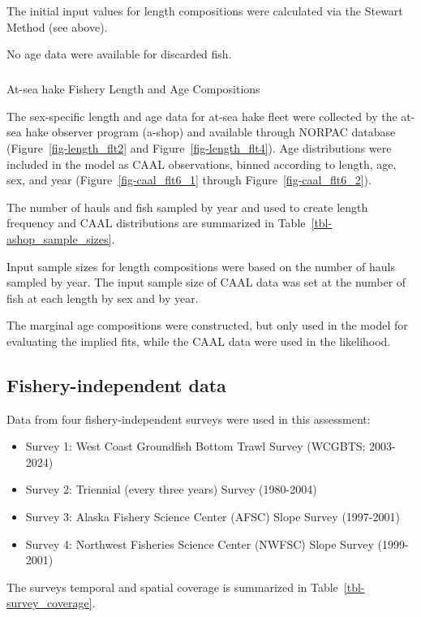 \documentclass[
]{scrartcl}
\makeatletter
\let\oldsubparagraph\subparagraph
\renewcommand{\subparagraph}{
    \@ifstar
      \xxxSubParagraphStar
      \xxxSubParagraphNoStar
  }
\newcommand{\xxxSubParagraphStar}[1]{\oldsubparagraph*{#1}\mbox{}}
\newcommand{\xxxSubParagraphNoStar}[1]{\oldsubparagraph{#1}\mbox{}}
\providecommand{\tightlist}{%
  \setlength{\itemsep}{0pt}\setlength{\parskip}{0pt}}\usepackage{longtable,booktabs,array}
\makeatother
\begin{document}
The initial input values for length compositions were calculated via the
Stewart Method (see above).

No age data were available for discarded fish.

\subparagraph{At-sea hake Fishery Length and Age
Compositions}\label{at-sea-hake-fishery-length-and-age-compositions}

The sex-specific length and age data for at-sea hake fleet were
collected by the at-sea hake observer program (a-shop) and available
through NORPAC database (Figure~\ref{fig-length_flt2} and
Figure~\ref{fig-length_flt4}). Age distributions were included in the
model as CAAL observations, binned according to length, age, sex, and
year (Figure~\ref{fig-caal_flt6_1} through
Figure~\ref{fig-caal_flt6_2}).

The number of hauls and fish sampled by year and used to create length
frequency and CAAL distributions are summarized in
Table~\ref{tbl-ashop_sample_sizes}.

Input sample sizes for length compositions were based on the number of
hauls sampled by year. The input sample size of CAAL data was set at the
number of fish at each length by sex and by year.

The marginal age compositions were constructed, but only used in the
model for evaluating the implied fits, while the CAAL data were used in
the likelihood.

\subsection{Fishery-independent data}\label{sec-surveys}

Data from four fishery-independent surveys were used in this assessment:

\begin{itemize}
\tightlist
\item
  Survey 1: West Coast Groundfish Bottom Trawl Survey (WCGBTS;
  2003-2024)
\item
  Survey 2: Triennial (every three years) Survey (1980-2004)\\
\item
  Survey 3: Alaska Fishery Science Center (AFSC) Slope Survey
  (1997-2001)
\item
  Survey 4: Northwest Fisheries Science Center (NWFSC) Slope Survey
  (1999-2001)
\end{itemize}

The surveys temporal and spatial coverage is summarized in
Table~\ref{tbl-survey_coverage}.
\end{document}
